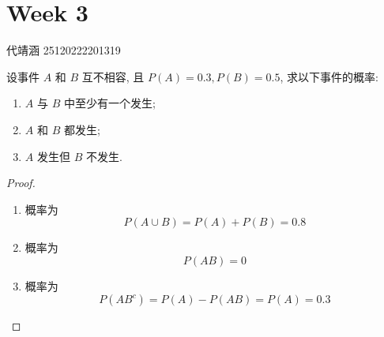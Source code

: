 \documentclass[../main.tex]{subfiles}
\begin{document}
\ifSubfilesClassLoaded{

    
    \setcounter{chapter}{2}
}{}

\chapter{ Week 3 }

代靖涵 25120222201319

\begin{exercise}{}{}
设事件 $A$ 和 $B$ 互不相容, 且 $P(A) = 0.3, P(B) = 0.5$, 求以下事件的概率:
\begin{enumerate}
    \item $A$ 与 $B$ 中至少有一个发生;
    \item $A$ 和 $B$ 都发生;
    \item $A$ 发生但 $B$ 不发生.
\end{enumerate}
\end{exercise}

\begin{proof}
    \begin{enumerate}
        \item 概率为 \[
        P\left( A\cup B \right)= P\left( A \right)+ P\left( B \right)= 0.8   
        \]
        \item 概率为 \[
        P\left( AB \right)=0 
        \]
        \item 概率为 \[
        P\left( A  B^{c} \right)= P\left( A \right)-P\left( AB \right)= P\left( A \right)= 0.3   
        \]
    \end{enumerate}
    
\end{proof}
\end{document}

